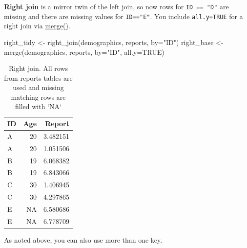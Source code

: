 \documentclass[
]{book}
\newenvironment{Shaded}{\begin{snugshade}}{\end{snugshade}}
\newcommand{\AttributeTok}[1]{\textcolor[rgb]{0.77,0.63,0.00}{#1}}
\newcommand{\ConstantTok}[1]{\textcolor[rgb]{0.00,0.00,0.00}{#1}}
\newcommand{\FunctionTok}[1]{\textcolor[rgb]{0.00,0.00,0.00}{#1}}
\newcommand{\NormalTok}[1]{#1}
\newcommand{\OtherTok}[1]{\textcolor[rgb]{0.56,0.35,0.01}{#1}}
\newcommand{\StringTok}[1]{\textcolor[rgb]{0.31,0.60,0.02}{#1}}
\begin{document}
\textbf{Right join} is a mirror twin of the left join, so now rows for \texttt{ID\ ==\ "D"} are missing and there are missing values for \texttt{ID=="E"}. You include \texttt{all.y=TRUE} for a right join via \href{https://stat.ethz.ch/R-manual/R-devel/library/base/html/merge.html}{merge()}.

\begin{Shaded}
\begin{Highlighting}[]
\NormalTok{right\_tidy }\OtherTok{\textless{}{-}} \FunctionTok{right\_join}\NormalTok{(demographics, reports, }\AttributeTok{by=}\StringTok{"ID"}\NormalTok{) }
\NormalTok{right\_base }\OtherTok{\textless{}{-}} \FunctionTok{merge}\NormalTok{(demographics, reports, }\AttributeTok{by=}\StringTok{"ID"}\NormalTok{, }\AttributeTok{all.y=}\ConstantTok{TRUE}\NormalTok{)}
\end{Highlighting}
\end{Shaded}

\begin{table}

\caption{\label{tab:unnamed-chunk-195}Right join. All rows from reports tables are used and missing matching rows are filled with `NA`}
\centering
\begin{tabular}[t]{l|r|r}
\hline
ID & Age & Report\\
\hline
A & 20 & 3.482151\\
\hline
A & 20 & 1.051506\\
\hline
B & 19 & 6.068382\\
\hline
B & 19 & 6.843066\\
\hline
C & 30 & 1.406945\\
\hline
C & 30 & 4.297865\\
\hline
E & NA & 6.580686\\
\hline
E & NA & 6.778709\\
\hline
\end{tabular}
\end{table}

As noted above, you can also use more than one key.
\end{document}
